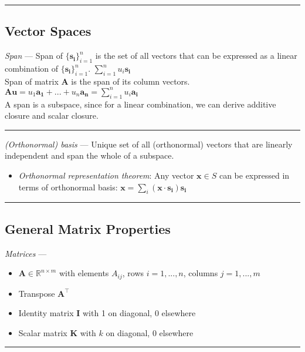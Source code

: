 {\color{black}\hrule height 0.001mm}

\subsection*{Vector Spaces}
\emph{Span} --- Span of $\{\boldsymbol{s_i}\}_{i=1}^n$ is the set of all vectors that can be expressed as a linear combination of $\{\boldsymbol{s_i}\}_{i=1}^n$.
$\sum_{i=1}^n u_i \boldsymbol{s_i}$
\\
Span of matrix $\boldsymbol{A}$ is the span of its column vectors.
$\boldsymbol{A}\boldsymbol{u} = u_1 \boldsymbol{a_1} + ... + u_n \boldsymbol{a_n} = \sum_{i=1}^n u_i \boldsymbol{a_i}$
\\
A span is a subspace, since for a linear combination, we can derive additive closure and scalar closure.

{\color{lightgray}\hrule height 0.001mm}

\emph{(Orthonormal) basis} --- Unique set of all (orthonormal) vectors that are linearly independent and span the whole of a subspace.
\begin{itemize}
    \item \emph{Orthonormal representation theorem}: Any vector $\boldsymbol{x} \in S$ can be expressed in terms of orthonormal basis: $\boldsymbol{x} = \sum_i (\boldsymbol{x} \cdot \boldsymbol{s_i})\boldsymbol{s_i}$
\end{itemize}

{\color{black}\hrule height 0.001mm}

\subsection*{General Matrix Properties}
\emph{Matrices} ---
\begin{itemize}
    \item $\boldsymbol{A} \in \mathbb{R}^{n \times m}$ with elements $A_{ij}$, rows $i = 1,...,n$, columns $j = 1,...,m$
    \item Transpose $\boldsymbol{A^\intercal}$
    \item Identity matrix $\boldsymbol{I}$ with 1 on diagonal, 0 elsewhere
    \item Scalar matrix $\boldsymbol{K}$ with $k$ on diagonal, 0 elsewhere
\end{itemize}

{\color{lightgray}\hrule height 0.001mm}

